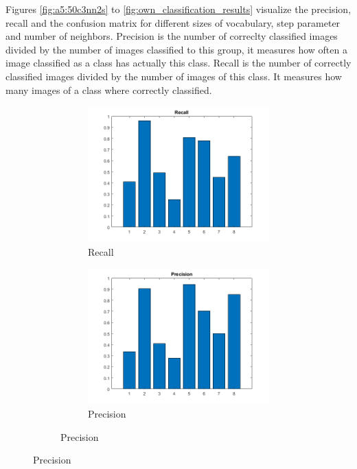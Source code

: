 Figures \ref{fig:a5:50c3nn2s} to \ref{fig:own_classification_results} visualize the precision, recall and the confusion matrix for different sizes of vocabulary, step parameter and number of neighbors. Precision is the number of correclty classified images divided by the number of images classified to this group, it measures how often a image classified as a class has actually this class. Recall is the number of correctly classified images divided by the number of images of this class. It measures how many images of a class where correctly classified.
\begin{figure}[h]
	\centering
	\begin{subfigure}{0.3\textwidth}
		\begin{subfigure}[t]{\textwidth}
			\includegraphics[width=\textwidth]{figures/recall_50C_3NN_2S.png} 
			\caption{Recall}
		\end{subfigure}
		\begin{subfigure}[t]{\textwidth}
			\includegraphics[width=\textwidth]{figures/precision_50C_3NN_2S.png}
			\caption{Precision}
		\end{subfigure}


\end{subfigure}
\end{figure}
